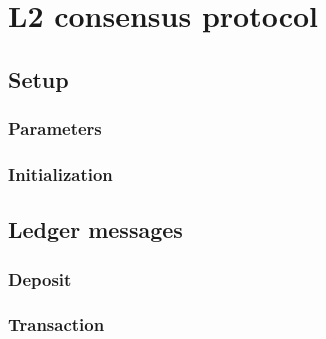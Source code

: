 \documentclass[../hydrozoa.tex]{subfiles}
\begin{document}
\chapter{L2 consensus protocol}%
\label{h:l2-consensus-protocol}

\section{Setup}%
\label{h:consensus-setup}

\subsection{Parameters}%
\label{h:consensus-parameters}




\subsection{Initialization}%
\label{h:consensus-intitialization}



\section{Ledger messages}%
\label{h:consensus-ledger}

\subsection{Deposit}%
\label{h:consensus-deposit}



\subsection{Transaction}%
\label{h:consensus-transaction}
\end{document}
